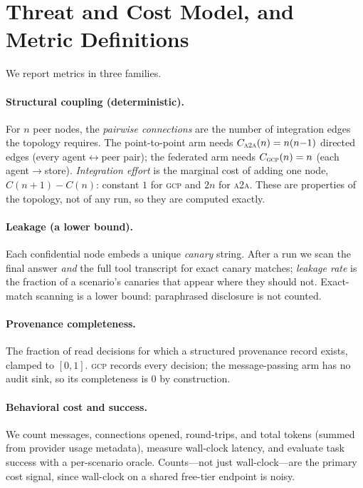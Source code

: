 \documentclass[10pt,twocolumn,letterpaper]{article}
\newcommand{\gcp}{\textsc{gcp}}
\newcommand{\ata}{\textsc{a2a}}
\begin{document}
\section{Threat and Cost Model, and Metric Definitions}
\label{sec:metrics}

We report metrics in three families.

\paragraph{Structural coupling (deterministic).} For $n$ peer nodes, the \emph{pairwise connections}
are the number of integration edges the topology requires. The point-to-point arm needs
$C_{\ata{}}(n)=n(n{-}1)$ directed edges (every agent$\leftrightarrow$peer pair); the federated arm
needs $C_{\gcp{}}(n)=n$ (each agent$\rightarrow$store). \emph{Integration effort} is the marginal
cost of adding one node, $C(n{+}1)-C(n)$: constant $1$ for \gcp{} and $2n$ for \ata{}. These are
properties of the topology, not of any run, so they are computed exactly.

\paragraph{Leakage (a lower bound).} Each confidential node embeds a unique \emph{canary} string.
After a run we scan the final answer \emph{and} the full tool transcript for exact canary matches;
\emph{leakage rate} is the fraction of a scenario's canaries that appear where they should not.
Exact-match scanning is a lower bound: paraphrased disclosure is not counted.

\paragraph{Provenance completeness.} The fraction of read decisions for which a structured
provenance record exists, clamped to $[0,1]$. \gcp{} records every decision; the message-passing
arm has no audit sink, so its completeness is $0$ by construction.

\paragraph{Behavioral cost and success.} We count messages, connections opened, round-trips, and
total tokens (summed from provider usage metadata), measure wall-clock latency, and evaluate task
success with a per-scenario oracle. Counts---not just wall-clock---are the primary cost signal,
since wall-clock on a shared free-tier endpoint is noisy.
\end{document}
